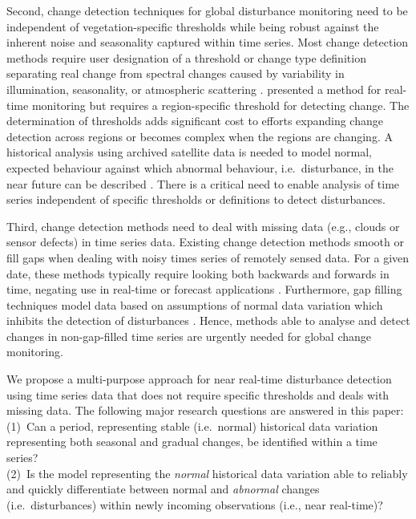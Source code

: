 \documentclass[authoryear,preprint,review,10pt]{elsarticle}
\begin{document}
Second, change detection techniques for global disturbance monitoring need to be independent of vegetation-specific thresholds while being robust against the inherent noise and seasonality captured within time series.
Most change detection methods require user designation of a threshold or change type definition separating real change from spectral changes caused by variability in illumination, seasonality, or atmospheric scattering \citep{Lu2004, Potter2003, Hayes2007}.  \citet{White2006} presented a method for real-time monitoring but requires a region-specific threshold for detecting change. The determination of thresholds adds significant cost to efforts expanding change detection across regions or becomes complex when the regions are changing. A historical analysis using archived satellite data is needed to model normal, expected behaviour against which abnormal behaviour, i.e.\ disturbance, in the near future can be described \citep{Hargrove2009}. There is a critical need to enable analysis of time series independent of specific thresholds or definitions to detect disturbances.

Third, change detection methods need to deal with missing data (e.g., clouds or sensor defects) in time series data.
Existing change detection methods smooth or fill gaps \citep{Jonsson2002, Roerink2000, Julien2010} when dealing with noisy times series of remotely sensed data. For a given date, these methods typically require looking both backwards and forwards in time, negating use in real-time or forecast applications \citep{White2006}.  Furthermore, gap filling techniques model data based on assumptions of normal data variation which inhibits the detection of disturbances \citep{Samanta:2011hp}. Hence, methods able to analyse and detect changes in non-gap-filled time series are urgently needed for global change monitoring.

We propose a multi-purpose approach for near real-time disturbance detection using time series data that does not require specific thresholds and deals with missing data. The following major research questions are answered in this paper: \\
(1)~Can a period, representing stable (i.e.\ normal) historical data variation representing both seasonal and gradual changes, be identified within a time series?\\
(2)~Is the model representing the \emph{normal} historical data variation able to reliably and quickly differentiate between normal and \emph{abnormal} changes (i.e.\ disturbances) within newly incoming observations (i.e., near real-time)?
\end{document}
